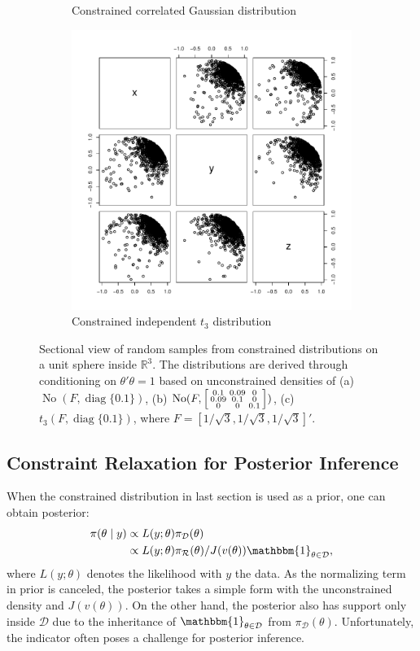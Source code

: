 \documentclass[10pt]{article}
\newcommand{\be}{\begin{equation}\begin{aligned}}
\newcommand{\ee}{\end{aligned}\end{equation}}
\newcommand{\bb}[1]{\mathbb{#1}}
\newcommand{\mc}[1]{\mathcal{#1}}
\DeclareMathOperator{\No}{No}
\DeclareMathOperator{\diag}{diag}
\DeclareMathOperator{\1}{\mathbbm{1}}
\begin{document}
\begin{figure}[H]
\begin{subfigure}[b]{0.30\textwidth}
\caption{Constrained correlated Gaussian distribution}
\end{subfigure}
\begin{subfigure}[b]{0.30\textwidth}
\includegraphics[width=1\textwidth]{sphere_t}
\caption{Constrained independent $t_3$ distribution}
\end{subfigure}
\caption{Sectional view of random samples from constrained distributions on a unit sphere inside $\bb R^3$. The distributions are derived through conditioning on $\theta'\theta=1$ based on unconstrained densities of (a) $\No( F, \diag\{0.1\})$, (b) $\No(F, \left[\protect\begin{smallmatrix} 0.1 & 0.09 & 0 \\ 0.09 & 0.1 & 0 \\ 0 & 0 &0.1  \protect\end{smallmatrix}\right])$, (c) $t_3(F,\diag\{0.1\} )$, where $F=[1/\sqrt{3},1/\sqrt{3},1/\sqrt{3}]'$.}
\label{sphere_examples}
\end{figure}

\subsection{Constraint Relaxation for Posterior Inference}

When the constrained distribution in last section is used as a prior,
one can obtain posterior:
\be
\label{exactPosterior}
\pi(\theta\mid y) & \propto L(y;\theta)\pi_{\mc D}(\theta) \\
& \propto L(y;\theta) \pi_{\mc
R}(\theta) /J(v(\theta))\mathbbm{1}_{\theta\in \mc D},
\ee
where $L(y;\theta)$ denotes the likelihood with $y$ the data. As the
normalizing term in prior is canceled, the posterior takes a simple form
with the unconstrained density and $J(v(\theta))$. On the other hand, the
posterior also has support only inside $\mc D$ due to the inheritance of
$\mathbbm{1}_{\theta\in \mc D}$ from $\pi_{\mc D}(\theta)$. Unfortunately,
the indicator often poses a challenge for posterior inference. 
\end{document}
